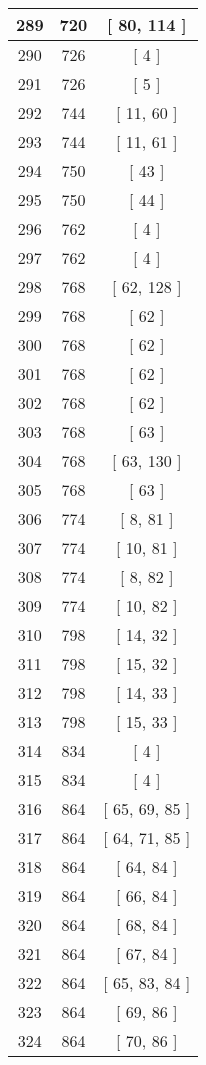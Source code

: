 \begin{center}
\begin{longtable}[H]{|| c c c ||}
\hline
289 & 720 & [ 80, 114 ] \\ 
\hline
290 & 726 & [ 4 ] \\ 
\hline
291 & 726 & [ 5 ] \\ 
\hline
292 & 744 & [ 11, 60 ] \\ 
\hline
293 & 744 & [ 11, 61 ] \\ 
\hline
294 & 750 & [ 43 ] \\ 
\hline
295 & 750 & [ 44 ] \\ 
\hline
296 & 762 & [ 4 ] \\ 
\hline
297 & 762 & [ 4 ] \\ 
\hline
298 & 768 & [ 62, 128 ] \\ 
\hline
299 & 768 & [ 62 ] \\ 
\hline
300 & 768 & [ 62 ] \\ 
\hline
301 & 768 & [ 62 ] \\ 
\hline
302 & 768 & [ 62 ] \\ 
\hline
303 & 768 & [ 63 ] \\ 
\hline
304 & 768 & [ 63, 130 ] \\ 
\hline
305 & 768 & [ 63 ] \\ 
\hline
306 & 774 & [ 8, 81 ] \\ 
\hline
307 & 774 & [ 10, 81 ] \\ 
\hline
308 & 774 & [ 8, 82 ] \\ 
\hline
309 & 774 & [ 10, 82 ] \\ 
\hline
310 & 798 & [ 14, 32 ] \\ 
\hline
311 & 798 & [ 15, 32 ] \\ 
\hline
312 & 798 & [ 14, 33 ] \\ 
\hline
313 & 798 & [ 15, 33 ] \\ 
\hline
314 & 834 & [ 4 ] \\ 
\hline
315 & 834 & [ 4 ] \\ 
\hline
316 & 864 & [ 65, 69, 85 ] \\ 
\hline
317 & 864 & [ 64, 71, 85 ] \\ 
\hline
318 & 864 & [ 64, 84 ] \\ 
\hline
319 & 864 & [ 66, 84 ] \\ 
\hline
320 & 864 & [ 68, 84 ] \\ 
\hline
321 & 864 & [ 67, 84 ] \\ 
\hline
322 & 864 & [ 65, 83, 84 ] \\ 
\hline
323 & 864 & [ 69, 86 ] \\ 
\hline
324 & 864 & [ 70, 86 ] \\ 

\end{longtable}
\end{center}
